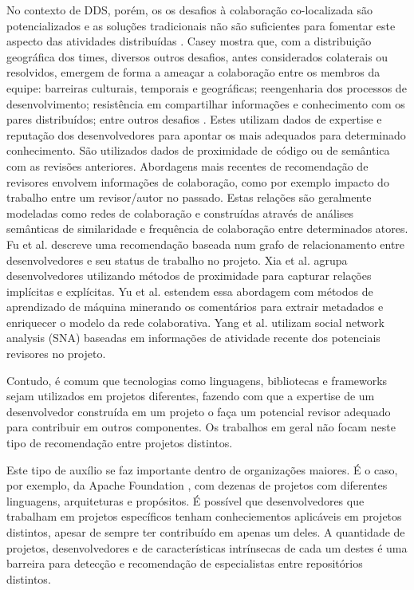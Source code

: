 \documentclass[sigconf]{acmart}
\begin{document}
No contexto de DDS, porém, os os desafios à colaboração co-localizada são potencializados e as soluções tradicionais não são suficientes para fomentar este aspecto das atividades distribuídas \cite{nicolaci2011}. Casey \cite{casey2010} mostra que, com a distribuição geográfica dos times, diversos outros desafios, antes considerados colaterais ou resolvidos, emergem de forma a ameaçar a colaboração entre os membros da equipe: barreiras culturais, temporais e geográficas; reengenharia dos processos de desenvolvimento; resistência em compartilhar informações e conhecimento com os pares distribuídos; entre outros desafios \cite{pimentel2008, silva2009}. Estes utilizam dados de expertise e reputação dos desenvolvedores para apontar os mais adequados para determinado conhecimento. São utilizados dados de proximidade de código ou de semântica com as revisões anteriores. Abordagens mais recentes de recomendação de revisores envolvem informações de colaboração, como por exemplo impacto do trabalho entre um revisor/autor no passado. Estas relações são geralmente modeladas como redes de colaboração e construídas através de análises semânticas de similaridade e frequência de colaboração entre determinados atores. Fu et al. \cite{fu2017} descreve uma recomendação baseada num grafo de relacionamento entre desenvolvedores e seu status de trabalho no projeto. Xia et al. \cite{xia2017} agrupa desenvolvedores utilizando métodos de proximidade para capturar relações implícitas e explícitas. Yu et al. \cite{yu2014,yu2014-2} estendem essa abordagem com métodos de aprendizado de máquina minerando os comentários para extrair metadados e enriquecer o modelo da rede colaborativa. Yang et al. \cite{yang2016} utilizam social network analysis (SNA) baseadas em informações de atividade recente dos potenciais revisores no projeto.

Contudo, é comum que tecnologias como linguagens, bibliotecas e frameworks sejam utilizados em projetos diferentes, fazendo com que a expertise de um desenvolvedor construída em um projeto o faça um potencial revisor adequado para contribuir em outros componentes. Os trabalhos em geral não focam neste tipo de recomendação entre projetos distintos.

Este tipo de auxílio se faz importante dentro de organizações maiores. É o caso, por exemplo, da Apache Foundation \cite{chelkowski2016}, com dezenas de projetos com diferentes linguagens, arquiteturas e propósitos. É possível que desenvolvedores que trabalham em projetos específicos tenham conheciementos aplicáveis em projetos distintos, apesar de sempre ter contribuído em apenas um deles. A quantidade de projetos, desenvolvedores e de características intrínsecas de cada um destes é uma barreira para detecção e recomendação de especialistas entre repositórios distintos.
\end{document}
